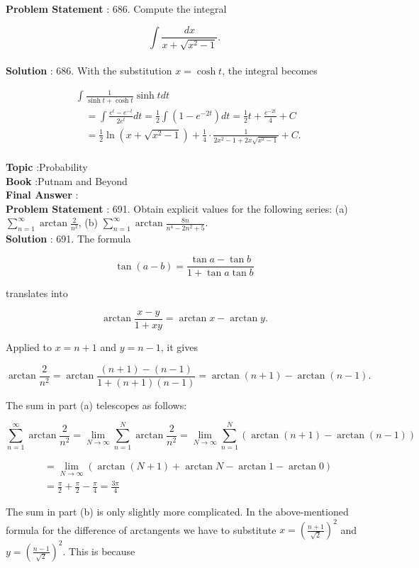 \documentclass[10pt]{article}
\begin{document}
\textbf{Problem Statement} :
686. Compute the integral

$$
\int \frac{d x}{x+\sqrt{x^{2}-1}} .
$$
\\
\textbf{Solution} :
686. With the substitution $x=\cosh t$, the integral becomes

$$
\begin{aligned}
&\int \frac{1}{\sinh t+\cosh t} \sinh t d t \\
&\quad=\int \frac{e^{t}-e^{-t}}{2 e^{t}} d t=\frac{1}{2} \int\left(1-e^{-2 t}\right) d t=\frac{1}{2} t+\frac{e^{-2 t}}{4}+C \\
&\quad=\frac{1}{2} \ln \left(x+\sqrt{x^{2}-1}\right)+\frac{1}{4} \cdot \frac{1}{2 x^{2}-1+2 x \sqrt{x^{2}-1}}+C .
\end{aligned}
$$
\\
\textbf{Topic} :Probability\\
\textbf{Book} :Putnam and Beyond\\
\textbf{Final Answer} :\\


\textbf{Problem Statement} :
691. Obtain explicit values for the following series:
(a) $\sum_{n=1}^{\infty} \arctan \frac{2}{n^{2}}$,
(b) $\sum_{n=1}^{\infty} \arctan \frac{8 n}{n^{4}-2 n^{2}+5}$.
\\
\textbf{Solution} :
691. The formula

$$
\tan (a-b)=\frac{\tan a-\tan b}{1+\tan a \tan b}
$$

translates into

$$
\arctan \frac{x-y}{1+x y}=\arctan x-\arctan y .
$$

Applied to $x=n+1$ and $y=n-1$, it gives

$$
\arctan \frac{2}{n^{2}}=\arctan \frac{(n+1)-(n-1)}{1+(n+1)(n-1)}=\arctan (n+1)-\arctan (n-1) .
$$

The sum in part (a) telescopes as follows:

$$
\sum_{n=1}^{\infty} \arctan \frac{2}{n^{2}}=\lim _{N \rightarrow \infty} \sum_{n=1}^{N} \arctan \frac{2}{n^{2}}=\lim _{N \rightarrow \infty} \sum_{n=1}^{N}(\arctan (n+1)-\arctan (n-1))
$$



$$
\begin{aligned}
&=\lim _{N \rightarrow \infty}(\arctan (N+1)+\arctan N-\arctan 1-\arctan 0) \\
&=\frac{\pi}{2}+\frac{\pi}{2}-\frac{\pi}{4}=\frac{3 \pi}{4}
\end{aligned}
$$

The sum in part (b) is only slightly more complicated. In the above-mentioned formula for the difference of arctangents we have to substitute $x=\left(\frac{n+1}{\sqrt{2}}\right)^{2}$ and $y=\left(\frac{n-1}{\sqrt{2}}\right)^{2}$. This is because
\end{document}

